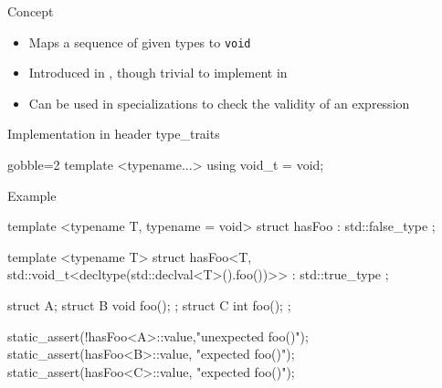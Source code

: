 \begin{frame}[fragile]
  \begin{block}{Concept}
    \begin{itemize}
    \item Maps a sequence of given types to \texttt{void}
    \item Introduced in , though trivial to implement in 
    \item Can be used in specializations to check the validity of an expression
    \end{itemize}
  \end{block}
  \begin{block}{Implementation in header type\_traits}
    \begin{cppcode*}{gobble=2}
      template <typename...>
      using void_t = void;
    \end{cppcode*}
  \end{block}
\end{frame}

\begin{frame}[fragile]
    \begin{exampleblock}{Example}
      \begin{cppcode*}{}
      template <typename T, typename = void>
      struct hasFoo : std::false_type {};

      template <typename T>
      struct hasFoo<T,
         std::void_t<decltype(std::declval<T>().foo())>>
      : std::true_type {};

      struct A{}; struct B{ void foo(); };
      struct C{ int foo(); };

      static_assert(!hasFoo<A>::value,"unexpected foo()");
      static_assert(hasFoo<B>::value, "expected foo()");
      static_assert(hasFoo<C>::value, "expected foo()");
      \end{cppcode*}
    \end{exampleblock}
\end{frame}

